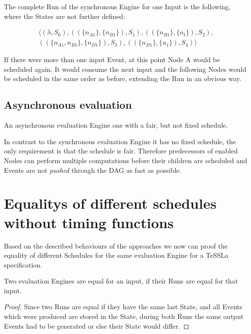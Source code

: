 The complete Run of the synchronous Engine for one Input is the following, where the States are not further defined:

\begin{align*}
  \langle
    (\lambda,                             S_0),
    ((\{ n_{A1}         \}, \{n_{B1}\}),  S_1),
    ((\{ n_{B1}         \}, \{o_1\}),     S_2),\\
    ((\{ n_{A1}, n_{B1} \}, \{n_{D1}\}),  S_3),
    ((\{ n_{D1}         \}, \{u_1\}),     S_4)
  \rangle
\end{align*}

If there were more than one input Event, at this point Node A would be scheduled again.
It would consume the next input and the following Nodes would be scheduled in the same order as before, extending the Run in an obvious way.

\subsection{Asynchronous evaluation}
\label{sec:concepts:behaviour_without_timing:async}

An asynchronous evaluation Engine one with a fair, but not fixed schedule.

In contrast to the synchronous evaluation Engine it has no fixed schedule, the only requirement is that the schedule is fair.
Therefore predecessors of enabled Nodes can perform multiple computations before their children are scheduled and Events are not \emph{pushed} through the DAG as fast as possible.

\section{Equalitys of different schedules without timing functions}
\label{sec:concepts:equalitys_without_timing}

Based on the described behaviours of the approaches we now can proof the equality of different Schedules for the same evaluation Engine for a TeSSLa specification.

\begin{lemma}
  Two evaluation Engines are equal for an input, if their Runs are equal for that input.
\label{lemma:eval_equal_if_runs_equal}
\end{lemma}
\begin{proof}
  Since two Runs are equal if they have the same last State, and all Events which were produced are stored in the State, during both Runs the same output Events had to be generated or else their State would differ.
\end{proof}


